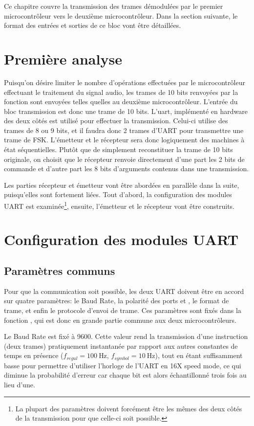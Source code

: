 Ce chapitre couvre la transmission des trames démodulées par le premier microcontrôleur vers le deuxième microcontrôleur. Dans la section suivante, le format des entrées et sorties de ce bloc vont être détaillées.

\section{Première analyse}
Puisqu'on désire limiter le nombre d'opérations effectuées par le microcontrôleur effectuant le traitement du signal audio, les trames de 10 bits renvoyées par la fonction  sont envoyées telles quelles au deuxième microcontrôleur. L'entrée du bloc transmission est donc une trame de 10 bits. L'uart, implémenté en hardware des deux côtés est utilisé pour effectuer la transmission. Celui-ci utilise des trames de 8 ou 9 bits, et il faudra donc 2 trames d'UART pour transmettre une trame de FSK. L'émetteur et le récepteur sera donc logiquement des machines à état séquentielles. Plutôt que de simplement reconstituer la trame de 10 bits originale, on choisit que le récepteur renvoie directement d'une part les 2 bits de commande et d'autre part les 8 bits d'arguments contenus dans une transmission.

Les parties récepteur et émetteur vont être abordées en parallèle dans la suite, puisqu'elles sont fortement liées. Tout d'abord, la configuration des modules UART est examinée\footnote{La plupart des paramètres doivent forcément être les mêmes des deux côtés de la transmission pour que celle-ci soit possible.}, ensuite, l'émetteur et le récepteur vont être construits.

\section{Configuration des modules UART}
\subsection{Paramètres communs}
Pour que la communication soit possible, les deux UART doivent être en accord sur quatre paramètres: le Baud Rate, la polarité des ports  et , le format de trame, et enfin le protocole d'envoi de trame.
Ces paramètres sont fixés dans la fonction , qui est donc en grande partie commune aux deux microcontrôleurs.

Le Baud Rate est fixé à \num{9600}. Cette valeur rend la transmission d'une instruction (deux trames) pratiquement instantanée par rapport aux autres constantes de temps en présence ($f_{regul} = \SI{100}{\hertz}$, $f_{symbol} = \SI{10}{\hertz}$), tout en étant suffisamment basse pour permettre d'utiliser l'horloge de l'UART en 16X speed mode, ce qui diminue la probabilité d'erreur car chaque bit est alors échantillonné trois fois au lieu d'une.

